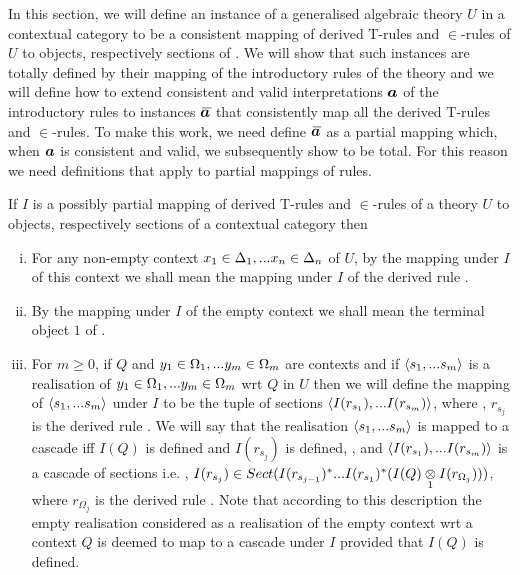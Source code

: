 
\newcommand{\clause}[1]{clause (#1) of definition \lref{consistentinterpretation}}
\newcommand{\condition}[2]{condition (#2) of \clause{#1}}

In this section, we will define an instance of a generalised algebraic theory $U$ in a contextual category \catcw to be a consistent mapping 
of derived T-rules and $\in$-rules of  $U$ to objects, respectively sections of \catc. 
We will show that such instances are totally defined by their mapping of the introductory rules of the theory and we will define how to extend 
consistent and valid interpretations $\iI$ of the introductory rules   to instances $\Ibar$ that consistently map all the derived  T-rules and $\in$-rules.
To make this work, we need define $\Ibar$ as a partial mapping which, when $\iI$ is consistent and valid, we subsequently show to be total. For this reason we need definitions that apply to partial mappings of rules.
\begin{numbereddefinition}
If $I$ is a  possibly partial mapping of derived T-rules and $\in$-rules of a theory $U$ to objects, respectively sections of a contextual category \catcw then
\begin{enumerate}[(i)]
\item
For any non-empty context $\xDelta{n}$ of $U$, by the mapping under $I$ of this context we shall mean the mapping under $I$ of the derived rule
.  
\item
By the mapping under $I$ of the empty context we shall mean the terminal object $1$ of \catc.
\item
For $m \geq 0$, if  $Q$ and $\yOmega{m}$ are contexts and if $\tuple{\sm}$ is a realisation of $\yOmega{m}$ wrt $Q$ in $U$
then we will define the mapping of  $\tuple{\sm}$ under $I$ to be the tuple of sections
$\tuple{I(r_{s_1}),...I(r_{s_m})}$, 
where \foreachj, $r_{s_j}$ is the derived rule .
We will say that the realisation $\tuple{\sm}$ is mapped to a cascade iff $I(Q)$ is defined and
 $I(r_{s_j})$ is defined, \foreachj, and 
 $\tuple{I(r_{s_1}),...I(r_{s_m})}$ is a cascade of sections i.e. \foreachj, 
 $I(r_{s_j}) \in Sect(I(r_{s_{j-1}})^*...I(r_{s_1})^*(\crossx{I(Q)}{I(r_{\Omega_j})}{1}))$,
where $r_{\Omega_j}$ is the derived rule . Note that according to this description 
the empty realisation considered as a realisation of the empty context wrt a context $Q$ is deemed to map to a cascade under $I$ provided that $I(Q)$
is defined.  
\end{enumerate}
\end{numbereddefinition}
\newcommand{\smMappedToCacscade}{
for all contexts $Q$ and for all realisations $\tuple{\sm}$ of $\yOmega{m}$ wrt $Q$ 
which map to a cascade under $I$ ,}
\newcommand{\sjpconclusion}{\ofT{s'_j}{\Omega'_j[s_1|y_1,...s_{j-1}|y_{j-1}]}}
\newcommand{\IfIpartialmappingUtoC}{If $U$ is a generalised algebraic theory and \catcw is a contextual category 
and if $I$ is a partial mapping of derived T-rules and $\in$-rules of the theory $U$ to objects, respectively sections of the contextual category \catc}
\newcommand{\IfIpartialmappingUtoCw}{\IfIpartialmappingUtoC\ }

